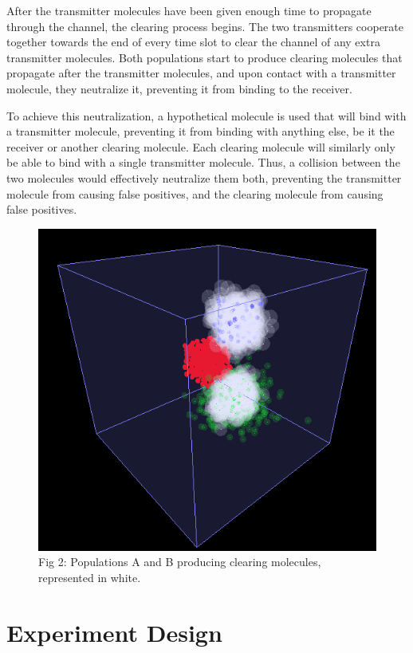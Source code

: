 \documentclass[conference]{IEEEtran}
\begin{document}
After the transmitter molecules have been given enough time to propagate through the channel, the clearing process begins. The two transmitters cooperate together towards the end of every time slot to clear the channel of any extra transmitter molecules. Both populations start to produce clearing molecules that propagate after the transmitter molecules, and upon contact with a transmitter molecule, they neutralize it, preventing it from binding to the receiver.
\\
\par
To achieve this neutralization, a hypothetical molecule is used that will bind with a transmitter molecule, preventing it from binding with anything else, be it the receiver or another clearing molecule. Each clearing molecule will similarly only be able to bind with a single transmitter molecule. Thus, a collision between the two molecules would effectively neutralize them both, preventing the transmitter molecule from causing false positives, and the clearing molecule from causing false positives.

\begin{figure}
\includegraphics[width=\linewidth]{Clearing.png}
\caption{Fig 2: Populations A and B producing clearing molecules, represented in white.}
\end{figure}

\section{Experiment Design}
\end{document}

